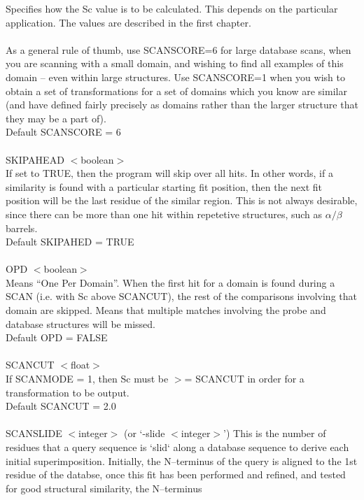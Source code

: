     Specifies how the Sc value is to be calculated.  This depends on
    the particular application.  The values are described in the
    first chapter.\\
    \\
    As a general rule of thumb, use SCANSCORE=6 for large database
    scans, when you are scanning with a small domain, and wishing to
    find all examples of this domain -- even within large structures. 
    Use SCANSCORE=1 when  you wish to obtain a set of
    transformations for a set of domains which you know are similar
    (and have defined fairly precisely as domains rather than the
    larger structure that they may be a part of).\\
    Default SCANSCORE = 6\\
    \\
    SKIPAHEAD $<$boolean$>$\\
    If set to TRUE, then the program will skip over all hits.  In
    other words, if a similarity is found with a particular starting
    fit position, then the next fit position will be the last residue
    of the similar region.  This is not always desirable, since there can
    be more than one hit within  repetetive structures, such as $\alpha/\beta$ barrels.\\
    Default SKIPAHED = TRUE\\
    \\
    OPD $<$boolean$>$\\
    Means ``One Per Domain''.  When the first hit for a domain is found during a SCAN
    (i.e. with Sc above SCANCUT), the rest of the comparisons involving that domain
    are skipped.  Means that multiple matches involving the probe and database structures
    will be missed.\\
    Default OPD = FALSE\\
    \\
    SCANCUT $<$float$>$\\
    If SCANMODE = 1, then Sc must be $>$= SCANCUT in order for a 
    transformation to be output.\\
    Default SCANCUT = 2.0\\
    \\
    SCANSLIDE $<$integer$>$ (or `-slide $<$integer$>$')
    This is the number of residues that a query sequence is `slid`
    along a database sequence to derive each initial superimposition. 
    Initially, the N--terminus of the query is aligned to the 1st
    residue of the databse, once this fit has been performed and
    refined, and tested for good structural similarity, the N--terminus

